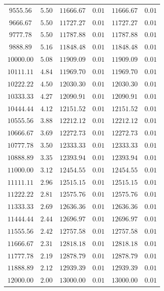 \documentclass[
	12pt,
	]{article}
\theoremstyle{definition}
\theoremstyle{definition}
\theoremstyle{definition}
\theoremstyle{definition}
\theoremstyle{definition}
\theoremstyle{example}
\theoremstyle{note}
\theoremstyle{remark}
\theoremstyle{example}
\begin{document}
\begin{longtable}{cccccc}
				$9555.56$&	$5.50$&	$11666.67$&	$0.01$&	$11666.67$&	$0.01$\\
				$9666.67$&	$5.50$&	$11727.27$&	$0.01$&	$11727.27$&	$0.01$\\
				$9777.78$&	$5.50$&	$11787.88$&	$0.01$&	$11787.88$&	$0.01$\\
				$9888.89$&	$5.16$&	$11848.48$&	$0.01$&	$11848.48$&	$0.01$\\
				$10000.00$&	$5.08$&	$11909.09$&	$0.01$&	$11909.09$&	$0.01$\\
				$10111.11$&	$4.84$&	$11969.70$&	$0.01$&	$11969.70$&	$0.01$\\
				$10222.22$&	$4.50$&	$12030.30$&	$0.01$&	$12030.30$&	$0.01$\\
				$10333.33$&	$4.27$&	$12090.91$&	$0.01$&	$12090.91$&	$0.01$\\
				$10444.44$&	$4.12$&	$12151.52$&	$0.01$&	$12151.52$&	$0.01$\\
				$10555.56$&	$3.88$&	$12212.12$&	$0.01$&	$12212.12$&	$0.01$\\
				$10666.67$&	$3.69$& $12272.73$&	$0.01$&	$12272.73$&	$0.01$\\
				$10777.78$&	$3.50$&	$12333.33$&	$0.01$&	$12333.33$&	$0.01$\\
				$10888.89$&	$3.35$&	$12393.94$&	$0.01$&	$12393.94$&	$0.01$\\
				$11000.00$&	$3.12$&	$12454.55$&	$0.01$&	$12454.55$&	$0.01$\\
				$11111.11$&	$2.96$&	$12515.15$&	$0.01$&	$12515.15$&	$0.01$\\
				$11222.22$&	$2.81$&	$12575.76$&	$0.01$&	$12575.76$&	$0.01$\\
				$11333.33$&	$2.69$&	$12636.36$&	$0.01$&	$12636.36$&	$0.01$\\
				$11444.44$&	$2.44$&	$12696.97$&	$0.01$&	$12696.97$&	$0.01$\\
				$11555.56$&	$2.42$&	$12757.58$&	$0.01$&	$12757.58$&	$0.01$\\
				$11666.67$&	$2.31$&	$12818.18$&	$0.01$&	$12818.18$&	$0.01$\\
				$11777.78$&	$2.19$&	$12878.79$&	$0.01$&	$12878.79$&	$0.01$\\
				$11888.89$&	$2.12$&	$12939.39$&	$0.01$&	$12939.39$&	$0.01$\\
				$12000.00$&	$2.00$&	$13000.00$&	$0.01$&	$13000.00$	&$0.01$
				\end{longtable}
		
	
\end{document}
